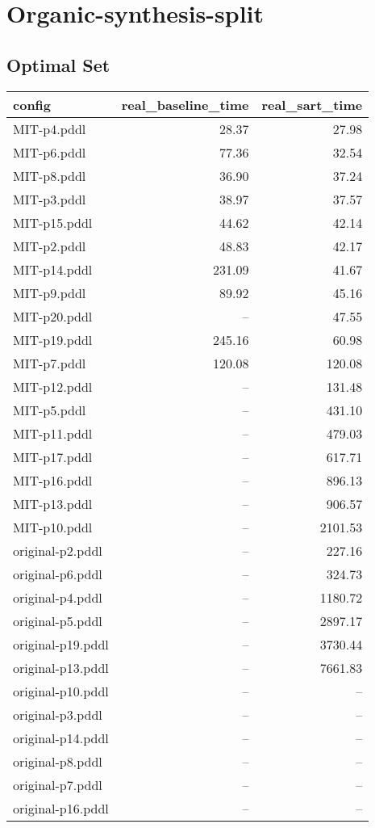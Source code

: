 \documentclass{article}
\begin{document}
                \newpage \section{Organic-synthesis-split}
                    \subsection*{Optimal Set}
                    
                            \begin{center}
                            \scriptsize
                            \begin{tabular}{@{}l|r|r@{}}
                            config & real\_baseline\_time & real\_sart\_time\\\midrule
                             MIT-p4.pddl&28.37&27.98\\
 MIT-p6.pddl&77.36&32.54\\
 MIT-p8.pddl&36.90&37.24\\
 MIT-p3.pddl&38.97&37.57\\
 MIT-p15.pddl&44.62&42.14\\
 MIT-p2.pddl&48.83&42.17\\
 MIT-p14.pddl&231.09&41.67\\
 MIT-p9.pddl&89.92&45.16\\
 MIT-p20.pddl&--&47.55\\
 MIT-p19.pddl&245.16&60.98\\
 MIT-p7.pddl&120.08&120.08\\
 MIT-p12.pddl&--&131.48\\
 MIT-p5.pddl&--&431.10\\
 MIT-p11.pddl&--&479.03\\
 MIT-p17.pddl&--&617.71\\
 MIT-p16.pddl&--&896.13\\
 MIT-p13.pddl&--&906.57\\
 MIT-p10.pddl&--&2101.53\\
 original-p2.pddl&--&227.16\\
 original-p6.pddl&--&324.73\\
 original-p4.pddl&--&1180.72\\
 original-p5.pddl&--&2897.17\\
 original-p19.pddl&--&3730.44\\
 original-p13.pddl&--&7661.83\\
 original-p10.pddl&--&--\\
 original-p3.pddl&--&--\\
 original-p14.pddl&--&--\\
 original-p8.pddl&--&--\\
 original-p7.pddl&--&--\\
 original-p16.pddl&--&--
                            \end{tabular}
                            \end{center}
                    
\end{document}
